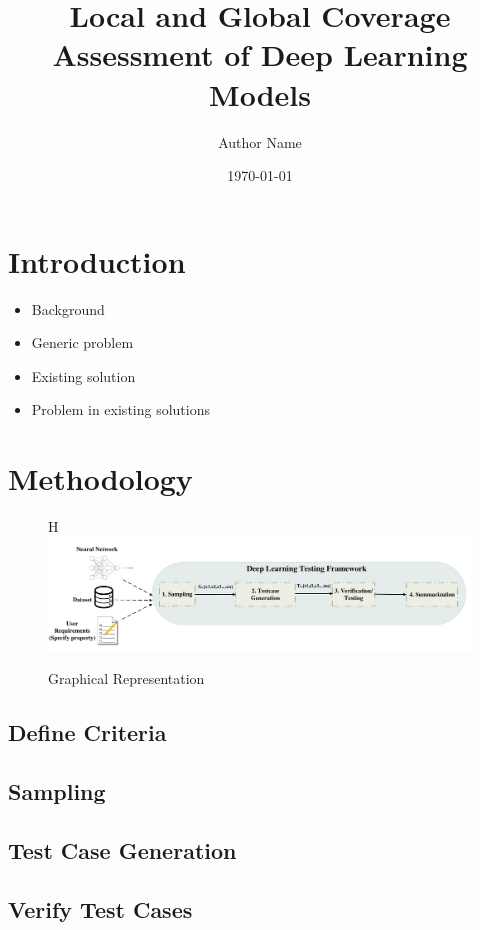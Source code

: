 \documentclass[10pt, conference, a4paper, final]{IEEEtran}
\title{Local and Global Coverage Assessment of Deep Learning Models}
\author{Author Name}
\date{\today}
\begin{document}
\maketitle

\begin{abstract}
\end{abstract}


\section{Introduction}
\begin{itemize}[noitemsep]
    \item Background
    \item Generic problem
    \item Existing solution
    \item Problem in existing solutions
\end{itemize}

\section{Methodology}
\begin{figure}{H}
    \centering
    \includegraphics[width=\linewidth]{paper_images/DL framework.pdf}
    \caption{Graphical Representation}
    \label{fig:graph}
\end{figure}
\subsection {Define Criteria}
\subsection {Sampling}
\subsection {Test Case Generation}
\subsection {Verify Test Cases}
\end{document}
